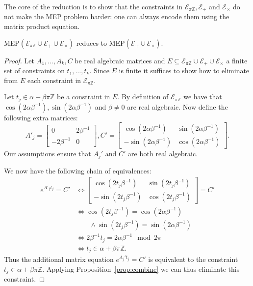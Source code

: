 The core of the reduction is to show that the constraints in
$\mathcal{E}_{\pi\mathbb{Z}},\mathcal{E}_{+}$ and
$\mathcal{E}_{\times}$ do not make the MEP problem harder: one can
always encode them using the matrix product equation.

\begin{proposition}
  MEP$(\mathcal{E}_{\pi\mathbb{Z}} \cup \mathcal{E}_{+} \cup
  \mathcal{E}_{\times})$ reduces to MEP$(\mathcal{E}_{+} \cup
  \mathcal{E}_{\times})$.
\label{lem:pi}
\end{proposition}
\begin{proof}
  Let $A_1,\ldots,A_k,C$ be real algebraic matrices and
  $E\subseteq \mathcal{E}_{\pi\mathbb{Z}} \cup \mathcal{E}_{+} \cup
  \mathcal{E}_{\times}$
  a finite set of constraints on $t_1,\ldots,t_k$.  Since $E$ is
  finite it suffices to show how to eliminate from $E$ each constraint
  in $\mathcal{E}_{\pi \mathbb{Z}}$.

  Let $t_j\in\alpha+\beta\pi\mathbb{Z}$ be a constraint in $E$.  By definition 
of  $\mathcal{E}_{\pi\mathbb{Z}}$ 
we have
  that $\cos(2\alpha\beta^{-1}),\sin(2\alpha\beta^{-1})$ and
  $\beta\neq0$ are real algebraic.  Now define the following extra
  matrices:
\[A'_j=\begin{bmatrix}0&2\beta^{-1}\\-2\beta^{-1}&0\end{bmatrix},
 C'=\begin{bmatrix}\cos(2\alpha\beta^{-1})&
\sin(2\alpha\beta^{-1})\\-\sin(2\alpha\beta^{-1})&\cos(2\alpha\beta^{-1})\end{bmatrix}.\]
Our assumptions ensure that $A_j'$ and $C'$ are both real algebraic.

We now have the following chain of equivalences:
\begin{align*}
e^{A'_j t_j}=C'
&\Leftrightarrow\begin{bmatrix}\cos(2t_j\beta^{-1})&
\sin(2t_j\beta^{-1})\\-\sin(2t_j\beta^{-1})&\cos(2t_j\beta^{-1})\end{bmatrix}
=C'\\
&\Leftrightarrow\cos(2t_j\beta^{-1})=\cos(2\alpha\beta^{-1})\\
&\qquad\wedge\sin(2t_j\beta^{-1})=\sin(2\alpha\beta^{-1})\\
&\Leftrightarrow2\beta^{-1}t_j=2\alpha\beta^{-1}\mod 2\pi\\
&\Leftrightarrow t_j\in\alpha+\beta\pi\mathbb{Z}.
\end{align*}
Thus the additional matrix equation $e^{A_j't_j}=C'$ is equivalent to
the constraint $t_j\in\alpha+\beta\pi\mathbb{Z}$.  Applying
Proposition~\ref{prop:combine} we can thus eliminate this constraint.
\end{proof}

